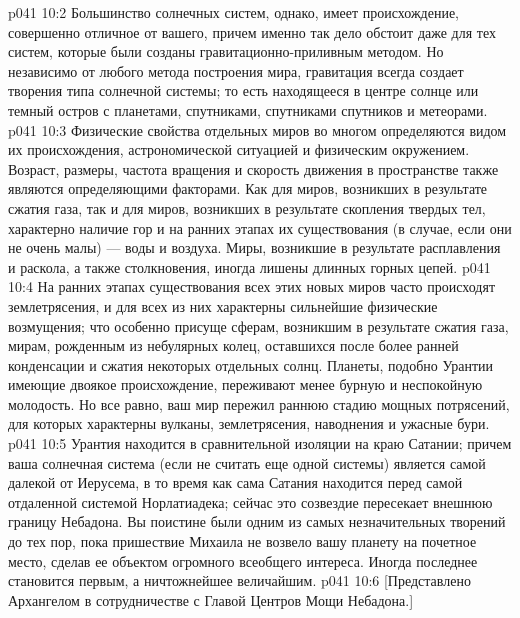 \vs p041 10:2 Большинство солнечных систем, однако, имеет происхождение, совершенно отличное от вашего, причем именно так дело обстоит даже для тех систем, которые были созданы гравитационно\hyp{}приливным методом. Но независимо от любого метода построения мира, гравитация всегда создает творения типа солнечной системы; то есть находящееся в центре солнце или темный остров с планетами, спутниками, спутниками спутников и метеорами.
\vs p041 10:3 \pc Физические свойства отдельных миров во многом определяются видом их происхождения, астрономической ситуацией и физическим окружением. Возраст, размеры, частота вращения и скорость движения в пространстве также являются определяющими факторами. Как для миров, возникших в результате сжатия газа, так и для миров, возникших в результате скопления твердых тел, характерно наличие гор и на ранних этапах их существования (в случае, если они не очень малы) --- воды и воздуха. Миры, возникшие в результате расплавления и раскола, а также столкновения, иногда лишены длинных горных цепей.
\vs p041 10:4 На ранних этапах существования всех этих новых миров часто происходят землетрясения, и для всех из них характерны сильнейшие физические возмущения; что особенно присуще сферам, возникшим в результате сжатия газа, мирам, рожденным из небулярных колец, оставшихся после более ранней конденсации и сжатия некоторых отдельных солнц. Планеты, подобно Урантии имеющие двоякое происхождение, переживают менее бурную и неспокойную молодость. Но все равно, ваш мир пережил раннюю стадию мощных потрясений, для которых характерны вулканы, землетрясения, наводнения и ужасные бури.
\vs p041 10:5 \pc Урантия находится в сравнительной изоляции на краю Сатании; причем ваша солнечная система (если не считать еще одной системы) является самой далекой от Иерусема, в то время как сама Сатания находится перед самой отдаленной системой Норлатиадека; сейчас это созвездие пересекает внешнюю границу Небадона. Вы поистине были одним из самых незначительных творений до тех пор, пока пришествие Михаила не возвело вашу планету на почетное место, сделав ее объектом огромного всеобщего интереса. Иногда последнее становится первым, а ничтожнейшее величайшим.
\vsetoff
\vs p041 10:6 [Представлено Архангелом в сотрудничестве с Главой Центров Мощи Небадона.]
